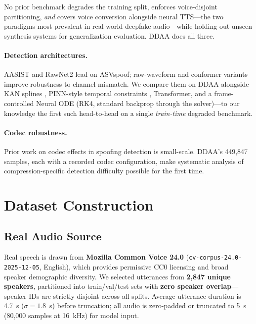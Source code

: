 \documentclass{article}
\newcommand{\ddaa}{\textsc{DDAA}}
\begin{document}
No prior benchmark degrades the training split, enforces voice-disjoint
partitioning, \emph{and} covers voice conversion alongside neural TTS---the
two paradigms most prevalent in real-world deepfake audio---while holding out
unseen synthesis systems for generalization evaluation.  \ddaa{} does all three.

\paragraph{Detection architectures.}
AASIST \citep{jung2022aasist} and RawNet2 \citep{tak2021end} lead on ASVspoof;
raw-waveform and conformer variants \citep{ge2021raw,martin2022vicomtech} improve robustness to channel mismatch.
We compare them on \ddaa{} alongside KAN splines \citep{liu2024kan,liu2024kan2}, PINN-style temporal constraints
\citep{raissi2019physics}, Transformer, and a frame-controlled Neural ODE \citep{chen2018neural} (RK4, standard backprop through the solver)---to our knowledge the first such head-to-head on a single \emph{train-time} degraded benchmark.

\paragraph{Codec robustness.}
Prior work on codec effects in spoofing detection
\citep{das2020attacker,shi2020robust} is small-scale.
\ddaa's 449,847 samples, each with a recorded codec configuration, make
systematic analysis of compression-specific detection difficulty possible
for the first time.

\section{Dataset Construction}
\label{sec:dataset}

\subsection{Real Audio Source}

Real speech is drawn from \textbf{Mozilla Common Voice 24.0}
(\texttt{cv-corpus-24.0-2025-12-05}, English), which provides permissive
CC0 licensing and broad speaker demographic diversity.  We selected
utterances from \textbf{2,847 unique speakers}, partitioned into
train/val/test sets with \textbf{zero speaker overlap}---speaker IDs are
strictly disjoint across all splits.  Average utterance duration is 4.7~s
($\sigma = 1.8$~s) before truncation; all audio is zero-padded or truncated
to 5~s (80,000 samples at 16~kHz) for model input.
\end{document}
